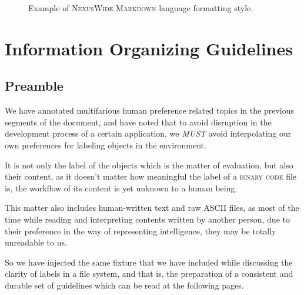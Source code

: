 \documentclass[13pt]{scrarticle}
\newcommand{\header}[1]{ \textsf{#1} \relax{}}
\newcommand{\important}[1]{\textit{#1}}
\newcommand{\name}[1]{{\textsc{#1}}}
\begin{document}
        \begin{figure}[h!]
            \caption{Example of \name{NexusWide} \name{Markdown} language formatting style.}
        \end{figure}


    \newpage
    \section{\header{Information Organizing Guidelines}}
    \subsection{\header{Preamble}}


    We have annotated multifarious human preference related topics in the previous segments of the document,
    and have noted that to avoid disruption in the development process of a certain application,
    we \important{MUST} avoid interpolating our own preferences for labeling objects in the environment. \newline

    It is not only the label of the objects which is the matter of evaluation,
    but also their content,
    as it doesn't matter how meaningful the label of a \name{binary code}\footnotemark{} file is,
    the workflow of its content is yet unknown to a human being. \newline

    This matter also includes human-written text and raw \name{ASCII}\footnotemark{} files,
    as most of the time while reading and interpreting contents written by another person,
    due to their preference in the way of representing intelligence,
    they may be totally unreadable to us. \newline

    So we have injected the same fixture that we have included while discussing the clarity of labels in a file system,
    and that is, the preparation of a consistent and durable set of guidelines which can be read at the following pages.


\end{document}
